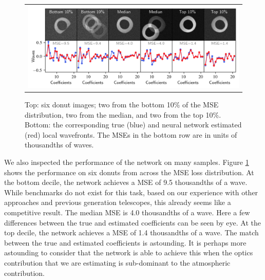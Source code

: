 \begin{figure}[!htbp]
\begin{center}
\begin{tabular}{c}
\includegraphics[width=\textwidth]{figs/cnn/donut_panel_test.png}
\end{tabular}
\end{center}
\caption[Panel of Donut Results]{Top: six donut images; two from the bottom 10\% of the MSE distribution, two from the median, and two from the top 10\%. Bottom: the corresponding true (blue) and neural network estimated (red) local wavefronts. The MSEs in the bottom row are in units of thousandths of waves.\label{fig:donut_panel}}
\end{figure}

We also inspected the performance of the network on many samples. Figure \ref{fig:donut_panel} shows the performance on six donuts from across the MSE loss distribution. At the bottom decile, the network achieves a MSE of 9.5 thousandths of a wave. While benchmarks do not exist for this task, based on our experience with other approaches and previous generation telescopes, this already seems like a competitive result. The median MSE is 4.0 thousandths of a wave. Here a few differences between the true and estimated coefficients can be seen by eye. At the top decile, the network achieves a MSE of 1.4 thousandths of a wave. The match between the true and estimated coefficients is astounding. It is perhaps more astounding to consider that the network is able to achieve this when the optics contribution that we are estimating is sub-dominant to the atmospheric contribution. 

